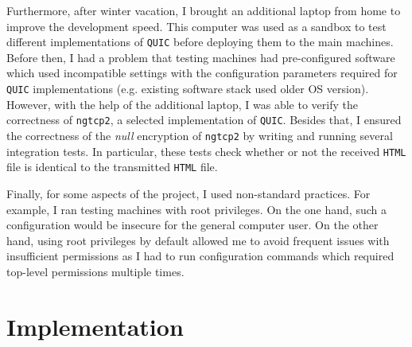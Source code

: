\documentclass[12pt,a4paper,twoside,openright]{report}
\begin{document}
    Furthermore, after winter vacation, I brought an additional laptop from home to improve the development speed.
    This computer was used as a sandbox to test different implementations of \texttt{QUIC} before deploying them to the main machines.
    Before then, I had a problem that testing machines had pre-configured software which used incompatible settings with the configuration parameters required for \texttt{QUIC} implementations (e.g. existing software stack used older OS version).
    However, with the help of the additional laptop, I was able to verify the correctness of \texttt{ngtcp2}, a selected implementation of \texttt{QUIC}.
    Besides that, I ensured the correctness of the \textit{null} encryption of \texttt{ngtcp2} by writing and running several integration tests.
    In particular, these tests check whether or not the received \texttt{HTML} file is identical to the transmitted \texttt{HTML} file.
    
    Finally, for some aspects of the project, I used non-standard practices.
    For example, I ran testing machines with root privileges.
    On the one hand, such a configuration would be insecure for the general computer user. On the other hand, using root privileges by default allowed me to avoid frequent issues with insufficient permissions as I had to run configuration commands which required top-level permissions multiple times.
    
    

\chapter{Implementation}



\end{document}
